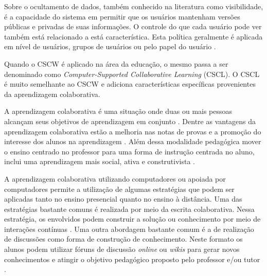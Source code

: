 Sobre o ocultamento de dados, também conhecido na literatura como visibilidade, é a capacidade do sistema em permitir que os usuários mantenham versões públicas e privadas de suas informações. O controle do que cada usuário pode ver também está relacionado a está característica. Esta política geralmente é aplicada em nível de usuários, grupos de usuários ou pelo papel do usuário \cite{ramanau_researching_2009, reinhard_cscw_1994}.

Quando o CSCW é aplicado na área da educação, o mesmo passa a ser denominado como \emph{Computer-Supported Collaborative Learning} (CSCL). O CSCL é muito semelhante ao CSCW e adiciona características específicas provenientes da aprendizagem colaborativa.



A aprendizagem colaborativa é uma situação onde duas ou mais pessoas alcançam seus objetivos de aprendizagem em conjunto \cite{chuang_sscls_2015}. Dentre as vantagens da aprendizagem colaborativa estão a melhoria nas notas de provas e a promoção do interesse dos alunos na aprendizagem \cite{caldwell_2007, pollock_2006}. Além dessa modalidade pedagógica mover o ensino centrado no professor para uma forma de instrução centrada no aluno, inclui uma aprendizagem mais social, ativa e construtivista \cite{kirschner_2001}.

A aprendizagem colaborativa utilizando computadores ou apoiada por computadores permite a utilização de algumas estratégias que podem ser aplicadas tanto no ensino presencial quanto no ensino à distância. Uma das estratégias bastante comuns é realizada por meio da escrita colaborativa. Nessa estratégia, os envolvidos podem construir a solução ou conhecimento por meio de interações contínuas \cite{onrubia_2009}. Uma outra abordagem bastante comum é a de realização de discussões como forma de construção de conhecimento. Neste formato os alunos podem utilizar fóruns de discussão \emph{online} ou \emph{wikis} para gerar novos conhecimentos e atingir o objetivo pedagógico proposto pelo professor e/ou tutor \cite{ramanau_researching_2009}.

